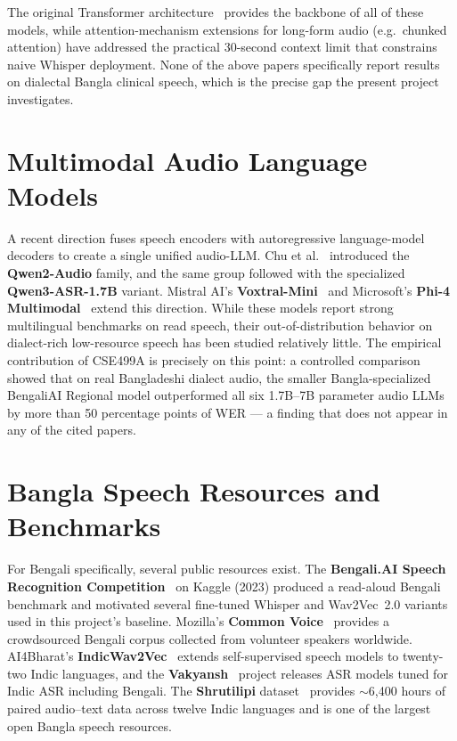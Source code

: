 \documentclass[12pt,a4paper]{article}
\begin{document}
The original Transformer architecture~\cite{rw:vaswani} provides the
backbone of all of these models, while attention-mechanism
extensions for long-form audio (e.g.\ chunked attention) have
addressed the practical 30-second context limit that constrains
naive Whisper deployment. None of the above papers specifically
report results on dialectal Bangla clinical speech, which is the
precise gap the present project investigates.

\section{Multimodal Audio Language Models}

A recent direction fuses speech encoders with autoregressive
language-model decoders to create a single unified audio-LLM.
Chu et al.~\cite{rw:qwen2audio} introduced the \textbf{Qwen2-Audio}
family, and the same group followed with the specialized
\textbf{Qwen3-ASR-1.7B} variant. Mistral AI's
\textbf{Voxtral-Mini}~\cite{rw:voxtral} and Microsoft's
\textbf{Phi-4 Multimodal}~\cite{rw:phi4} extend this direction.
While these models report strong multilingual benchmarks on read
speech, their out-of-distribution behavior on dialect-rich
low-resource speech has been studied relatively little. The
empirical contribution of CSE499A is precisely on this point: a
controlled comparison showed that on real Bangladeshi dialect
audio, the smaller Bangla-specialized BengaliAI Regional model
outperformed all six 1.7B--7B parameter audio LLMs by more than
50 percentage points of WER --- a finding that does not appear in
any of the cited papers.

\section{Bangla Speech Resources and Benchmarks}

For Bengali specifically, several public resources exist.
The \textbf{Bengali.AI Speech Recognition
Competition}~\cite{rw:bengaliai} on Kaggle (2023) produced a
read-aloud Bengali benchmark and motivated several fine-tuned
Whisper and Wav2Vec~2.0 variants used in this project's baseline.
Mozilla's \textbf{Common Voice}~\cite{rw:commonvoice} provides a
crowdsourced Bengali corpus collected from volunteer speakers
worldwide. AI4Bharat's \textbf{IndicWav2Vec}~\cite{rw:indicwav2vec}
extends self-supervised speech models to twenty-two Indic
languages, and the \textbf{Vakyansh}~\cite{rw:vakyansh} project
releases ASR models tuned for Indic ASR including Bengali. The
\textbf{Shrutilipi} dataset~\cite{rw:shrutilipi} provides
$\sim$6{,}400 hours of paired audio--text data across twelve Indic
languages and is one of the largest open Bangla speech resources.
\end{document}
